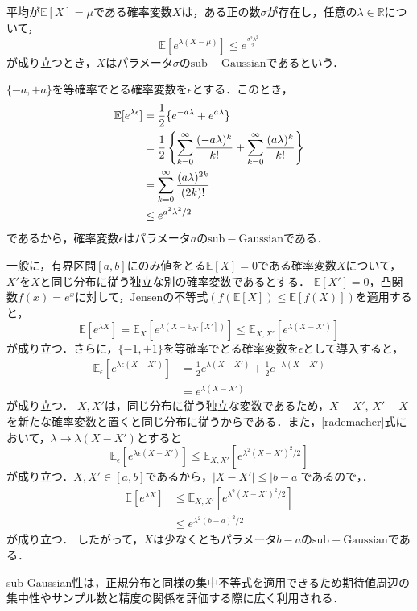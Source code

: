 \begin{deff}
    平均が$\mathbb{E}[X] = \mu$である確率変数$X$は，ある正の数$\sigma$が存在し，任意の$\lambda\in \mathbb{R}$について，
    \begin{equation*}
        \mathbb{E}[e^{\lambda(X-\mu)}] \leq e^{\frac{\sigma^2 \lambda^2}{2}}
    \end{equation*}
    が成り立つとき，$X$はパラメータ$\sigma$の$\mathrm{sub-Gaussian}$であるという．
\end{deff}


\begin{ex}
\label{rad_ex}
$\{-a, +a\}$を等確率でとる確率変数を$\epsilon$とする．このとき，
\begin{align}
    \mathbb{E}[e^{\lambda\epsilon}] &= \frac{1}{2}\{e^{-a\lambda} + e^{a\lambda}\} \notag \\
    &=\frac{1}{2} \left\{ \sum_{k = 0}^{\infty}\frac{(-a\lambda)^k}{k!} + \sum_{k = 0}^{\infty}\frac{(a\lambda)^k}{k!} \right\} \notag \\
    &= \sum_{k = 0}^{\infty}\frac{(a\lambda)^{2k}}{(2k)!} \notag \\
    \label{rademacher}
    &\leq e^{a^2\lambda^2/2}
\end{align}
であるから，確率変数$\epsilon$はパラメータ$a$の$\mathrm{sub-Gaussian}$である．
\end{ex}

\begin{ex}
一般に，有界区間$[a, b]$にのみ値をとる$\mathbb{E}[X] = 0$である確率変数$X$について，$X'$を$X$と同じ分布に従う独立な別の確率変数であるとする．
$\mathbb{E}[X'] = 0$，凸関数$f(x) = e^x$に対して，$\mathrm{Jensen}$の不等式$(f(\mathbb{E}[X]) \leq \mathbb{E}[f(X)])$\cite{IAJI}を適用すると，
\begin{equation*}
    \mathbb{E}[e^{\lambda X}] = \mathbb{E}_X[e^{\lambda(X-\mathbb{E}_{X'}[X'])}] \leq \mathbb{E}_{X, X'}[e^{\lambda (X-X')}]
\end{equation*}
が成り立つ．さらに，$\{-1, +1\}$を等確率でとる確率変数を$\epsilon$として導入すると，
\begin{align*}
    \mathbb{E}_{\epsilon}[e^{\lambda \epsilon (X-X')}] &= \frac{1}{2}e^{\lambda(X-X')}+\frac{1}{2}e^{-\lambda(X-X')} \\
    &= e^{\lambda (X-X')} 
\end{align*}
が成り立つ．
$X, X'$は，同じ分布に従う独立な変数であるため，$X-X'$, $X'-X$を新たな確率変数と置くと同じ分布に従うからである．また，\eqref{rademacher}式において，$\lambda \to \lambda(X-X')$とすると
\begin{equation*}
    \mathbb{E}_{\epsilon}[e^{\lambda \epsilon (X-X')}] \leq \mathbb{E}_{X, X'}[e^{\lambda^2 (X-X')^2/2}]
\end{equation*}
が成り立つ．$X, X'\in [a, b]$であるから，$|X-X'|\leq |b-a|$であるので，．
\begin{align*}
    \mathbb{E}[e^{\lambda X}] &\leq \mathbb{E}_{X, X'}[e^{\lambda^2 (X-X')^2/2}] \\
    &\leq e^{\lambda^2 (b-a)^2/2}
\end{align*}
が成り立つ．
したがって，$X$は少なくともパラメータ$b-a$の$\mathrm{sub-Gaussian}$である．
\end{ex}

sub-Gaussian性は，正規分布と同様の集中不等式を適用できるため期待値周辺の集中性やサンプル数と精度の関係を評価する際に広く利用される．




